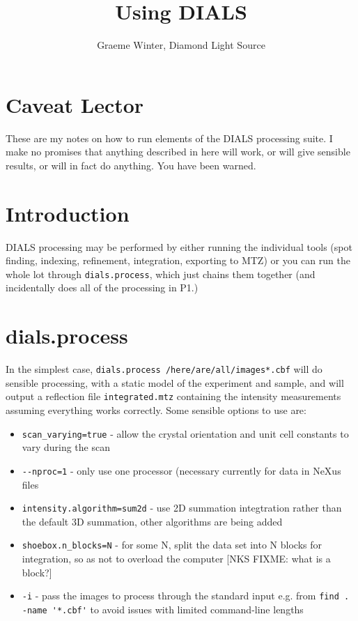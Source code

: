 \documentclass[a4paper, 11pt]{article}
\title{Using DIALS}
\author{Graeme Winter, Diamond Light Source}
\begin{document}
\maketitle

\section{Caveat Lector}

These are my notes on how to run elements of the DIALS processing suite. I make no promises that anything described in here will work, or will give sensible results, or will in fact do anything. You have been warned.

\section{Introduction}

DIALS processing may be performed by either running the individual tools (spot finding, indexing, refinement, integration, exporting to MTZ) or you can run the whole lot through \verb|dials.process|, which just chains them together (and incidentally does all of the processing in P1.)

\section{dials.process}

In the simplest case, \verb|dials.process /here/are/all/images*.cbf| will do  sensible processing, with a static model of the experiment and sample, and will output a reflection file \verb|integrated.mtz| containing the intensity measurements assuming everything works correctly. Some sensible options to use are:

\begin{itemize}
\item{\verb|scan_varying=true| - allow the crystal orientation and unit cell constants to vary during the scan}
\item{\verb|--nproc=1| - only use one processor (necessary currently for data in NeXus files}
\item{\verb|intensity.algorithm=sum2d| - use 2D summation integtration rather than the default 3D summation, other algorithms are being added}
\item{\verb|shoebox.n_blocks=N| - for some N, split the data set into N blocks for integration, so as not to overload the computer} [NKS FIXME:  what is a block?]
\item{\verb|-i| - pass the images to process through the standard input e.g. from \verb|find . -name '*.cbf'| to avoid issues with limited command-line lengths}
\end{itemize}
\end{document}
